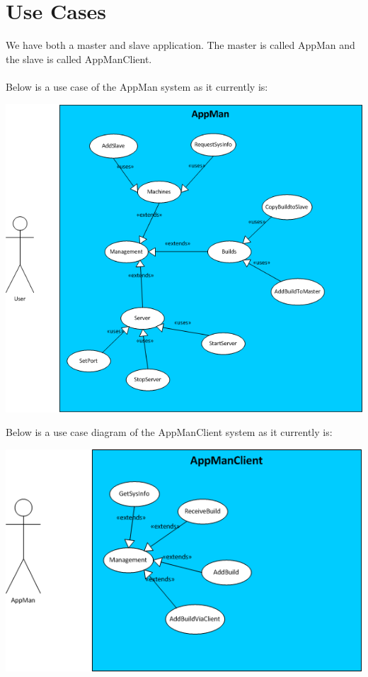 \documentclass[a4paper,12pt,final]{article}
\begin{document}
\newpage
\section{Use Cases}
We have both a master and slave application. The master is called AppMan and the slave is called AppManClient.\\
\textbf{\\}
Below is a use case of the AppMan system as it currently is:\\
\begin{center}
\includegraphics[scale=0.8]{UseCaseAppMan.png}
\end{center}
Below is a use case diagram of the AppManClient system as it currently is:\\
\begin{center}
\includegraphics[scale=0.7]{UseCaseAppManClient.png}
\end{center}
\end{document}
